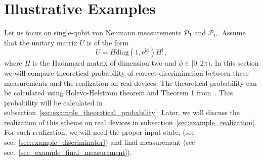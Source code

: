 \documentclass[preprint,12pt, a4paper]{elsarticle}
\newcommand{\1}{{\rm 1\hspace{-0.9mm}l}}
\newcommand{\ee}{\ensuremath{\mathrm{e}}}
\newcommand{\ii}{\ensuremath{\mathrm{i}}}
\newcommand{\PP}{\mathcal{P}}
\newcommand{\diag}{\mathrm{diag}}
\begin{document}
\section{Illustrative Examples}

Let us focus on single-qubit von Neumann measurements $\PP_\1$ and $\PP_U$.
Assume that the unitary matrix $U$ is of the form 
\begin{equation}
U = H \diag (1, \ee^{\ii \phi}) H^\dagger,
\end{equation}
where $H$ is the Hadamard matrix of dimension two and $\phi \in [0, 2 \pi)$.
In this section we will compare theoretical probability of correct 
discrimination between these measurements and the realization on real devices.
The theoretical probability can be calculated using Holevo-Helstrom theorem and 
Theorem 1 from~\cite{puchala2018strategies}. 
This probability will be calculated in 
subsection~\ref{sec:example_theoretical_probability}. Later, we will 
discuss the realization of this scheme on real devices in 
subsection~\ref{sec:example_realization}. For such realization, we 
will need the proper input state, (see sec.~\ref{sec:example_discriminator}) 
and final measurement (see sec.~\ref{sec_example_final_measurement}). 
\end{document}
